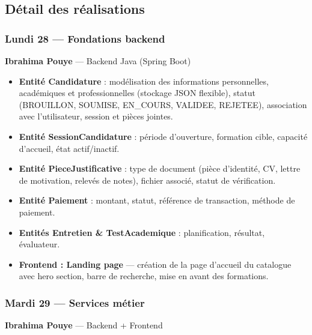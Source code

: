 \documentclass[a4paper,12pt,french]{article}
\begin{document}
\subsection{Détail des réalisations}

\subsubsection{Lundi 28 — Fondations backend}

\begin{assignmentbox}
\textbf{Ibrahima Pouye} — Backend Java (Spring Boot)
\end{assignmentbox}

\begin{itemize}
    \item \textbf{Entité Candidature} : modélisation des informations personnelles, académiques et professionnelles (stockage JSON flexible), statut (BROUILLON, SOUMISE, EN\_COURS, VALIDEE, REJETEE), association avec l'utilisateur, session et pièces jointes.
    \item \textbf{Entité SessionCandidature} : période d'ouverture, formation cible, capacité d'accueil, état actif/inactif.
    \item \textbf{Entité PieceJustificative} : type de document (pièce d'identité, CV, lettre de motivation, relevés de notes), fichier associé, statut de vérification.
    \item \textbf{Entité Paiement} : montant, statut, référence de transaction, méthode de paiement.
    \item \textbf{Entités Entretien \& TestAcademique} : planification, résultat, évaluateur.
    \item \textbf{Frontend : Landing page} — création de la page d'accueil du catalogue avec hero section, barre de recherche, mise en avant des formations.
\end{itemize}

\subsubsection{Mardi 29 — Services métier}

\begin{assignmentbox}
\textbf{Ibrahima Pouye} — Backend + Frontend
\end{assignmentbox}
\end{document}
